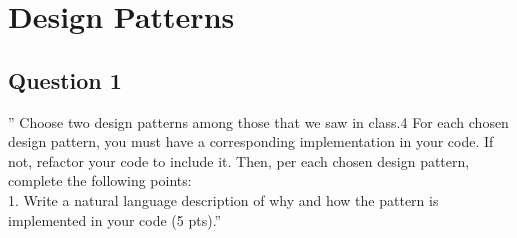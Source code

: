 \chapter{Design Patterns}
\section{Question 1}

'' Choose two design patterns among those that we saw in class.4 For each chosen design pattern, you must
have a corresponding implementation in your code. If not, refactor your code to include it. Then, per each
chosen design pattern, complete the following points:\\
1. Write a natural language description of why and how the pattern is implemented in your code (5 pts).''
